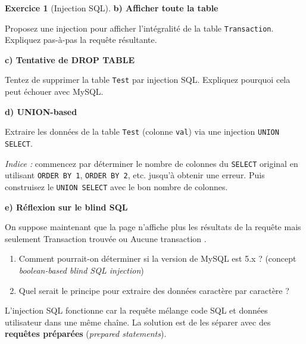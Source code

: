 \documentclass[a4paper,11pt]{article}
\theoremstyle{plain}
\theoremstyle{definition}
\newtheorem{exercice}{Exercice}
\begin{document}
\begin{exercice}[Injection SQL]
\medskip

\textbf{b) Afficher toute la table}

\medskip

Proposez une injection pour afficher l'intégralité de la table \texttt{Transaction}. Expliquez pas-à-pas la requête résultante.

\medskip

\textbf{c) Tentative de DROP TABLE}

\medskip

Tentez de supprimer la table \texttt{Test} par injection SQL. Expliquez pourquoi cela peut échouer avec MySQL.

\medskip

\textbf{d) UNION-based}

\medskip

Extraire les données de la table \texttt{Test} (colonne \texttt{val}) via une injection \texttt{UNION SELECT}.

\textit{Indice :} commencez par déterminer le nombre de colonnes du \texttt{SELECT} original en utilisant \texttt{ORDER BY 1}, \texttt{ORDER BY 2}, etc. jusqu'à obtenir une erreur. Puis construisez le \texttt{UNION SELECT} avec le bon nombre de colonnes.

\medskip

\textbf{e) Réflexion sur le blind SQL}

\medskip

On suppose maintenant que la page n'affiche plus les résultats de la requête mais seulement \og Transaction trouvée \fg{} ou \og Aucune transaction \fg{}.

\begin{enumerate}
    \item Comment pourrait-on déterminer si la version de MySQL est 5.x ? (concept \textit{boolean-based blind SQL injection})
    \item Quel serait le principe pour extraire des données caractère par caractère ?
\end{enumerate}

\begin{pointcle}
L'injection SQL fonctionne car la requête mélange code SQL et données utilisateur dans une même chaîne. La solution est de les séparer avec des \textbf{requêtes préparées} (\textit{prepared statements}).
\end{pointcle}

\end{exercice}


\end{document}
